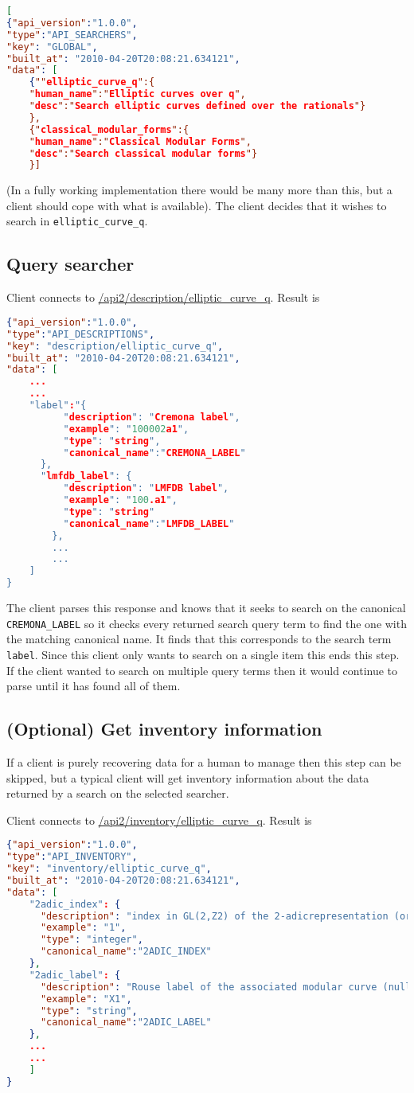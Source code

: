 \documentclass[11pt]{article}
\begin{document}
\begin{lstlisting}[language=json,firstnumber=1]
[
{"api_version":"1.0.0",
"type":"API_SEARCHERS",
"key": "GLOBAL",
"built_at": "2010-04-20T20:08:21.634121",
"data": [
	{""elliptic_curve_q":{
	"human_name":"Elliptic curves over q",
	"desc":"Search elliptic curves defined over the rationals"}
	},
	{"classical_modular_forms":{
	"human_name":"Classical Modular Forms",
	"desc":"Search classical modular forms"}
	}]
\end{lstlisting}
(In a fully working implementation there would be many more than this, but a client should cope with what is available). The client decides that it wishes to search in \texttt{elliptic\_curve\_q}.
\subsection{Query searcher}
Client connects to \url{/api2/description/elliptic_curve_q}. Result is
\begin{lstlisting}[language=json,firstnumber=1]
{"api_version":"1.0.0",
"type":"API_DESCRIPTIONS",
"key": "description/elliptic_curve_q",
"built_at": "2010-04-20T20:08:21.634121",
"data": [
	...
	...
	"label":"{
	      "description": "Cremona label", 
	      "example": "100002a1", 
	      "type": "string",
	      "canonical_name":"CREMONA_LABEL"
	  },
	  "lmfdb_label": {
	      "description": "LMFDB label", 
	      "example": "100.a1", 
	      "type": "string"
	      "canonical_name":"LMFDB_LABEL"
	    },
	    ...
	    ...
	]
}
\end{lstlisting}
The client parses this response and knows that it seeks to search on the canonical \texttt{CREMONA\_LABEL} so it checks every returned search query term to find the one with the matching canonical name. It finds that this corresponds to the search term \texttt{label}. Since this client only wants to search on a single item this ends this step. If the client wanted to search on multiple query terms then it would continue to parse until it has found all of them.
\subsection{(Optional) Get inventory information}
If a client is purely recovering data for a human to manage then this step can be skipped, but a typical client will get inventory information about the data returned by a search on the selected searcher.

Client connects to \url{/api2/inventory/elliptic_curve_q}. Result is
\begin{lstlisting}[language=json,firstnumber=1]
{"api_version":"1.0.0",
"type":"API_INVENTORY",
"key": "inventory/elliptic_curve_q",
"built_at": "2010-04-20T20:08:21.634121",
"data": [
    "2adic_index": {
      "description": "index in GL(2,Z2) of the 2-adicrepresentation (or 0 for CM curves)", 
      "example": "1", 
      "type": "integer",
      "canonical_name":"2ADIC_INDEX"
    }, 
    "2adic_label": {
      "description": "Rouse label of the associated modular curve (null for CM curves). Based on Rouse, Zureik-Brown classification", 
      "example": "X1", 
      "type": "string",
      "canonical_name":"2ADIC_LABEL"
    }, 
    ...
    ...
    ]
}
\end{lstlisting}
\end{document}
